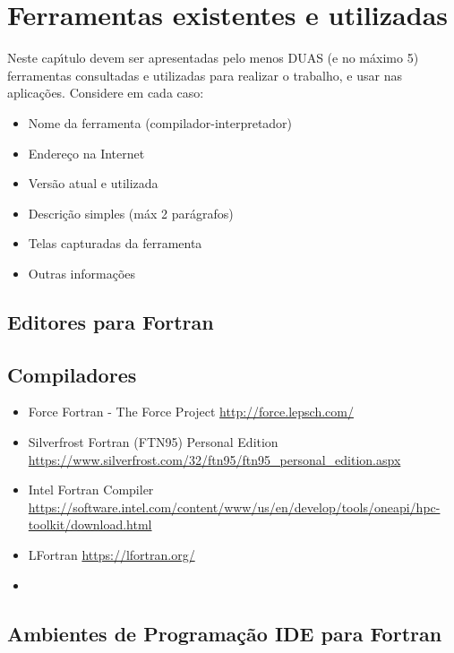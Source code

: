 

\chapter{Ferramentas existentes e utilizadas}

Neste cap\'{\i}tulo devem ser apresentadas pelo menos DUAS (e no m\'{a}ximo 5) ferramentas consultadas e utilizadas para realizar o trabalho, e usar nas aplica\c{c}\~{o}es. Considere em cada caso:
\begin{itemize}
  \item Nome da ferramenta (compilador-interpretador)
  \item Endere\c{c}o na Internet
  \item Vers\~{a}o atual e utilizada
  \item Descri\c{c}\~{a}o simples (m\'{a}x 2 par\'{a}grafos)
  \item Telas capturadas da ferramenta
  \item Outras informa\c{c}\~{o}es
\end{itemize}


    \section{Editores para Fortran}


    \section{Compiladores}
            \begin{itemize}
              \item Force Fortran - The Force Project \url{http://force.lepsch.com/}
              \item Silverfrost Fortran (FTN95) Personal Edition \url{https://www.silverfrost.com/32/ftn95/ftn95_personal_edition.aspx}
              \item Intel Fortran Compiler \url{https://software.intel.com/content/www/us/en/develop/tools/oneapi/hpc-toolkit/download.html}
              \item LFortran \url{https://lfortran.org/}
              \item
            \end{itemize}



    \section{Ambientes de Programa\c{c}\~{a}o IDE para Fortran}
